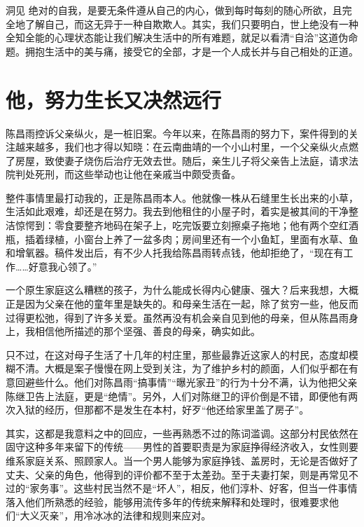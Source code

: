 \begin{quoteBox}{洞见}
绝对的自我，是要无条件遵从自己的内心，做到每时每刻的随心所欲，且完全地了解自己，而这无异于一种自欺欺人。其实，我们只要明白，世上绝没有一种全知全能的心理状态能让我们解决生活中的所有难题，就足以看清“自洽”这道伪命题。拥抱生活中的美与痛，接受它的全部，才是一个人成长并与自己相处的正道。
\end{quoteBox}

\clearpage
\section*{他，努力生长又决然远行}

陈昌雨控诉父亲纵火，是一桩旧案。今年以来，在陈昌雨的努力下，案件得到的关注越来越多，我们也才得以知晓：在云南曲靖的一个小山村里，一个父亲纵火点燃了房屋，致使妻子烧伤后治疗无效去世。随后，亲生儿子将父亲告上法庭，请求法院判处死刑，而这些举动也让他在亲戚当中颇受责备。

整件事情里最打动我的，正是陈昌雨本人。他就像一株从石缝里生长出来的小草，生活如此艰难，却还是在努力。我去到他租住的小屋子时，着实是被其间的干净整洁惊愕到：零食要整齐地码在架子上，吃完饭要立刻擦桌子拖地；他有两个空红酒瓶，插着绿植，小窗台上养了一盆多肉；房间里还有一个小鱼缸，里面有水草、鱼和增氧器。稿件发出后，有不少人托我给陈昌雨转点钱，他却拒绝了，“现在有工作……好意我心领了。”

一个原生家庭这么糟糕的孩子，为什么能成长得内心健康、强大？后来我想，大概正是因为父亲在他的童年里是缺失的。和母亲生活在一起，除了贫穷一些，他反而过得更松弛，得到了许多关爱。虽然再没有机会亲自见到他的母亲，但从陈昌雨身上，我相信他所描述的那个坚强、善良的母亲，确实如此。

只不过，在这对母子生活了十几年的村庄里，那些最靠近这家人的村民，态度却模糊不清。大概是案子慢慢在网上受到关注，为了维护乡村的颜面，人们似乎都在有意回避些什么。他们对陈昌雨“搞事情”“曝光家丑”的行为十分不满，认为他把父亲陈继卫告上法庭，更是“绝情”。另外，人们对陈继卫的评价倒是不错，即便他有两次入狱的经历，但那都不是发生在本村，好歹“他还给家里盖了房子”。

其实，这都是我意料之中的回应，一些再熟悉不过的陈词滥调。这部分村民依然在固守这种多年来留下的传统——男性的首要职责是为家庭挣得经济收入，女性则要维系家庭关系、照顾家人。当一个男人能够为家庭挣钱、盖房时，无论是否做好了丈夫、父亲的角色，他得到的评价都不至于太差劲。至于夫妻打架，则是再常见不过的“家务事”。这些村民当然不是“坏人”，相反，他们淳朴、好客，但当一件事情落入他们所熟悉的经验，能够用流传多年的传统来解释和处理时，很难要求他们“大义灭亲”，用冷冰冰的法律和规则来应对。

